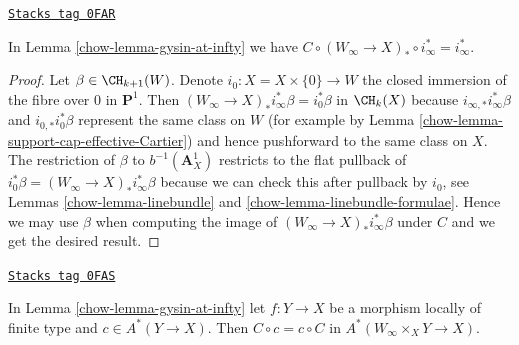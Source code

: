 \begin{lemma}
\label{chow-lemma-homomorphism-pre}
\href{https://stacks.math.columbia.edu/tag/0FAR}{\texttt{Stacks tag 0FAR}}

In Lemma \ref{chow-lemma-gysin-at-infty} we have
$C \circ (W_\infty \to X)_* \circ i_\infty^* = i_\infty^*$.
\end{lemma}

\begin{proof}

Let $\beta \in \CH_{k + 1}(W)$. Denote $i_0 : X = X \times \{0\} \to W$
the closed immersion of the fibre over $0$ in $\mathbf{P}^1$. Then
$(W_\infty \to X)_* i_\infty^* \beta = i_0^*\beta$ in $\CH_k(X)$ because
$i_{\infty, *}i_\infty^*\beta$ and $i_{0, *}i_0^*\beta$
represent the same class on $W$ (for example by
Lemma \ref{chow-lemma-support-cap-effective-Cartier})
and hence pushforward to the same class on $X$.
The restriction of $\beta$ to $b^{-1}(\mathbf{A}^1_X)$
restricts to the flat pullback of
$i_0^*\beta = (W_\infty \to X)_* i_\infty^* \beta$ because we can check
this after pullback by $i_0$, see
Lemmas \ref{chow-lemma-linebundle} and \ref{chow-lemma-linebundle-formulae}.
Hence we may use $\beta$ when computing the image of
$(W_\infty \to X)_*i_\infty^*\beta$ under $C$
and we get the desired result.
\end{proof}

\begin{lemma}
\label{chow-lemma-gysin-at-infty-commutes}
\href{https://stacks.math.columbia.edu/tag/0FAS}{\texttt{Stacks tag 0FAS}}

In Lemma \ref{chow-lemma-gysin-at-infty} let $f : Y \to X$ be a morphism
locally of finite type and $c \in A^*(Y \to X)$. Then $C \circ c = c \circ C$
in $A^*(W_\infty \times_X Y \to X)$.
\end{lemma}

